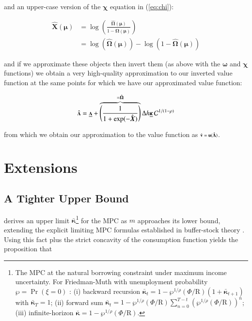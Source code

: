\documentclass[twocolumn, switch]{article}
\newcommand{\uFunc}{\mathbf{u}}
\newcommand{\CRRA}{\rho}
\newcommand{\Rfree}{\text{R}}
\newcommand{\tranShk}{\xi}
\newcommand{\WorstProb}{\wp}
\newcommand{\mNrm}{m}
\newcommand{\vFunc}{\mathbf{v}}
\newcommand{\AbsPatFac}{\Phi}
\newcommand{\vInv}{{\scriptsize \boldsymbol{\Lambda}}}
\newcommand{\vInvReal}{\hat{\vInv}}
\newcommand{\hNrm}{h}
\newcommand{\MPC}{\boldsymbol{\kappa}}
\newcommand{\MPCmin}{\underline{\MPC}}
\newcommand{\logmNrmEx}{\boldsymbol{\mu}}
\newcommand{\modRte}{\boldsymbol{\omega}}
\newcommand{\hNrmEx}{\Delta \hNrm}
\newcommand{\logitModRte}{\boldsymbol{\chi}}
\newcommand{\PDVCoverc}{\mathcal{C}}
\newcommand{\vFuncReal}{\hat{\vFunc}}
\newcommand{\vInvPes}{\underline{\vInv}}
\newcommand{\valModRte}{\boldsymbol{\Omega}}
\newcommand{\valModRteReal}{\hat{\valModRte}}
\newcommand{\logitValModRteReal}{\hat{\boldsymbol{X}}}
\newcommand{\MPCmax}{\bar{\MPC}}
\begin{document}
and an upper-case version of the $\logitModRte$ equation in (\ref{eq:chi}):

\begin{equation}
\label{eq:ChiUpper}
\begin{aligned}
\logitValModRteReal(\logmNrmEx) &= \log \left(\frac{\valModRteReal(\logmNrmEx)}{1-\valModRteReal(\logmNrmEx)}\right) \\
&= \log(\valModRteReal(\logmNrmEx)) - \log(1-\valModRteReal(\logmNrmEx))
\end{aligned}
\end{equation}

and if we approximate these objects then invert them (as above with the $\modRte$
and $\logitModRte$ functions) we obtain a very high-quality approximation to our
inverted value function at the same points for which we have our approximated
value function:

\begin{equation}
\label{eq:vInvHi}
\vInvReal = \vInvPes+\overbrace{\left(\frac{1}{1+\exp(-\logitValModRteReal)}\right)}^{=\valModRteReal} \hNrmEx \MPCmin \,\PDVCoverc^{1/(1-\CRRA) }
\end{equation}

from which we obtain our approximation to the value function as $\vFuncReal = \uFunc(\vInvReal)$.

\section{Extensions}

\subsection{A Tighter Upper Bound}

\citet{CarrollShanker2024} derives an upper limit
$\MPCmax$\footnote{The MPC at the natural borrowing constraint under maximum income uncertainty. For Friedman-Muth with unemployment probability $\WorstProb = \Pr(\tranShk = 0)$ \citep{CarrollToche2009}: (i) backward recursion $\MPCmax_{t} = 1 - \WorstProb^{1/\CRRA} (\AbsPatFac/\Rfree) (1 + \MPCmax_{t+1})$ with $\MPCmax_T = 1$; (ii) forward sum $\MPCmax_{t} = 1 - \WorstProb^{1/\CRRA} (\AbsPatFac/\Rfree) \sum_{n=0}^{T -t}\left(\WorstProb^{1/\CRRA} (\AbsPatFac/\Rfree)\right)^{n}$; (iii) infinite-horizon $\MPCmax = 1 - \WorstProb^{1/\CRRA} (\AbsPatFac/\Rfree)$.} for the MPC as $\mNrm$ approaches its
lower bound, extending the explicit limiting MPC formulas established in buffer-stock theory \citep{MaToda2021SavingRateRich}. Using this fact plus the strict concavity of the consumption
function yields the proposition that
\end{document}
